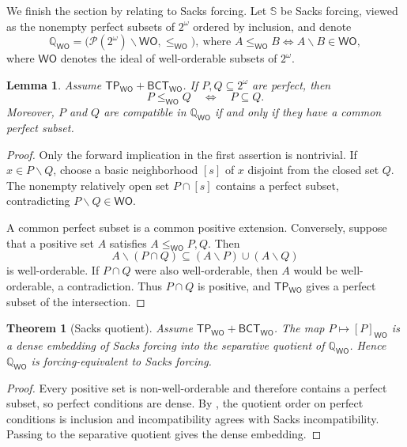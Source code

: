 \documentclass[11pt,reqno]{amsart}
\newcommand{\WO}{\mathsf{WO}}
\newcommand{\BCTWO}{\mathsf{BCT}_{\WO}}
\newcommand{\TP}{\mathsf{TP}_{\WO}}
\theoremstyle{plain}
\newtheorem{theorem}{Theorem}[section]
\newtheorem{lemma}[lemma]{Lemma}
\theoremstyle{definition}
\theoremstyle{remark}
\begin{document}
We finish the section by relating to Sacks forcing. Let $\mathbb S$ be Sacks forcing, viewed as the nonempty perfect subsets of $2^\omega$ ordered by inclusion, and denote
\[
 \mathbb Q_{\WO}=
 \bigl(\mathcal P(2^\omega)\smallsetminus\WO,\leq_{\WO}\bigr),
 \ \text{where }
 A\leq_{\WO}B\Longleftrightarrow A\smallsetminus B\in\WO,
\]
where $\WO$ denotes the ideal of well-orderable subsets of $2^\omega$.

\begin{lemma}\label{lem:perfect-quotient}
Assume $\TP+\BCTWO$.  If $P,Q\subseteq2^\omega$ are perfect, then
\[
 P\leq_{\WO}Q\quad\Longleftrightarrow\quad P\subseteq Q.
\]
Moreover, $P$ and $Q$ are compatible in $\mathbb Q_{\WO}$ if and only if
they have a common perfect subset.
\end{lemma}

\begin{proof}
Only the forward implication in the first assertion is nontrivial.  If
$x\in P\smallsetminus Q$, choose a basic neighborhood $[s]$ of $x$ disjoint from
the closed set $Q$.  The nonempty relatively open set $P\cap[s]$ contains a
perfect subset, contradicting $P\smallsetminus Q\in\WO$.

A common perfect subset is a common positive extension.  Conversely, suppose
that a positive set $A$ satisfies $A\leq_{\WO}P,Q$.  Then
\[
 A\smallsetminus(P\cap Q)\subseteq(A\smallsetminus P)\cup(A\smallsetminus Q)
\]
is well-orderable.  If $P\cap Q$ were also well-orderable, then $A$ would be
well-orderable, a contradiction.  Thus $P\cap Q$ is positive, and $\TP$
gives a perfect subset of the intersection.
\end{proof}

\begin{theorem}[Sacks quotient]\label{thm:sacks-quotient}
Assume $\TP+\BCTWO$.  The map $P\mapsto[P]_{\WO}$ is a dense embedding of
Sacks forcing into the separative quotient of $\mathbb Q_{\WO}$.  Hence
$\mathbb Q_{\WO}$ is forcing-equivalent to Sacks forcing.
\end{theorem}

\begin{proof}
Every positive set is non-well-orderable and therefore contains a perfect
subset, so perfect conditions are dense.  By , the
quotient order on perfect conditions is inclusion and incompatibility agrees
with Sacks incompatibility.  Passing to the separative quotient gives the
dense embedding.
\end{proof}
\end{document}
